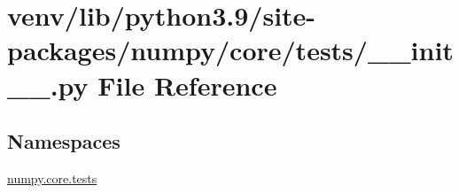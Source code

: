 \hypertarget{venv_2lib_2python3_89_2site-packages_2numpy_2core_2tests_2____init_____8py}{}\section{venv/lib/python3.9/site-\/packages/numpy/core/tests/\+\_\+\+\_\+init\+\_\+\+\_\+.py File Reference}
\label{venv_2lib_2python3_89_2site-packages_2numpy_2core_2tests_2____init_____8py}
\subsection*{Namespaces}
\begin{DoxyCompactItemize}
\item 
 \hyperlink{namespacenumpy_1_1core_1_1tests}{numpy.\+core.\+tests}
\end{DoxyCompactItemize}
